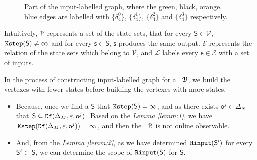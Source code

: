 \begin{figure}[thpb]
      \centering
      \caption{Part of the input-labelled graph, where the green, black, orange, blue edges are labelled with $\{\delta_4^0\}$, $\{\delta_4^1\}$, $\{\delta_4^2\}$ and $\{\delta_4^3\}$ respectively.}
      \label{fig:4}
\end{figure}

Intuitively, $\mathcal{V}$ represents a set of the state sets, that for every $\mathsf{S}\in \mathcal{V}$, ${\tt Kstep}(\mathsf{S})\ne \infty$ and for every $\mathsf{s}\in\mathsf{S}$, $\mathsf{s}$ produces the same output. $\mathcal{E}$ represents the relation of the state sets which belong to $\mathcal{V}$, and $\mathcal{L}$ labels every $\mathsf{e} \in\mathcal{E}$ with a set of inputs. %


In the process of constructing input-labelled graph for a \BCN\ ${\mathcal{B}}$, we build the vertexes with fewer states before building the vertexes with more states.
\begin{itemize}
\item  Because, once we find a $\mathsf{S}$ that ${\tt Kstep}(\mathsf{S})= \infty$, and as there exists $\mathsf{o}^{j}\in \Delta_N$ that $\mathsf{S}\subseteq {\tt Df}(\Delta_M,\varepsilon, \mathsf{o}^{j})$. Based on the {\em Lemma \ref{lemm:1}}, we have ${\tt Kstep}({\tt Df}(\Delta_M,\varepsilon, \mathsf{o}^{j}))= \infty$, and then the \BCN\ ${\mathcal{B}}$ is not online observable.
\item  And, from the {\em Lemma \ref{lemm:2}}, as we have determined ${\tt Rinput}(\mathsf{S}')$ for every $\mathsf{S}'\subset\mathsf{S}$, we can determine the scope of ${\tt Rinput}(\mathsf{S})$ for $\mathsf{S}$.
 \end{itemize}
